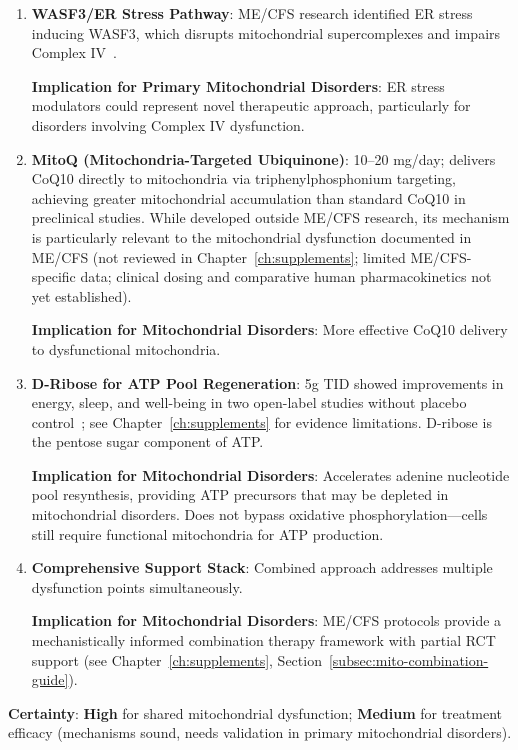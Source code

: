 \begin{enumerate}
    \item \textbf{WASF3/ER Stress Pathway}: ME/CFS research identified ER stress inducing WASF3, which disrupts mitochondrial supercomplexes and impairs Complex IV~\cite{wang2023wasf3}.

    \textbf{Implication for Primary Mitochondrial Disorders}: ER stress modulators could represent novel therapeutic approach, particularly for disorders involving Complex IV dysfunction.

    \item \textbf{MitoQ (Mitochondria-Targeted Ubiquinone)}: 10--20 mg/day; delivers CoQ10 directly to mitochondria via triphenylphosphonium targeting, achieving greater mitochondrial accumulation than standard CoQ10 in preclinical studies. While developed outside ME/CFS research, its mechanism is particularly relevant to the mitochondrial dysfunction documented in ME/CFS (not reviewed in Chapter~\ref{ch:supplements}; limited ME/CFS-specific data; clinical dosing and comparative human pharmacokinetics not yet established).

    \textbf{Implication for Mitochondrial Disorders}: More effective CoQ10 delivery to dysfunctional mitochondria.

    \item \textbf{D-Ribose for ATP Pool Regeneration}: 5g TID showed improvements in energy, sleep, and well-being in two open-label studies without placebo control~\cite{Teitelbaum2006ribose,Teitelbaum2012ribose}; see Chapter~\ref{ch:supplements} for evidence limitations. D-ribose is the pentose sugar component of ATP.

    \textbf{Implication for Mitochondrial Disorders}: Accelerates adenine nucleotide pool resynthesis, providing ATP precursors that may be depleted in mitochondrial disorders. Does not bypass oxidative phosphorylation---cells still require functional mitochondria for ATP production.

    \item \textbf{Comprehensive Support Stack}: Combined approach addresses multiple dysfunction points simultaneously.

    \textbf{Implication for Mitochondrial Disorders}: ME/CFS protocols provide a mechanistically informed combination therapy framework with partial RCT support (see Chapter~\ref{ch:supplements}, Section~\ref{subsec:mito-combination-guide}).
\end{enumerate}

\textbf{Certainty}: \textbf{High} for shared mitochondrial dysfunction; \textbf{Medium} for treatment efficacy (mechanisms sound, needs validation in primary mitochondrial disorders).

